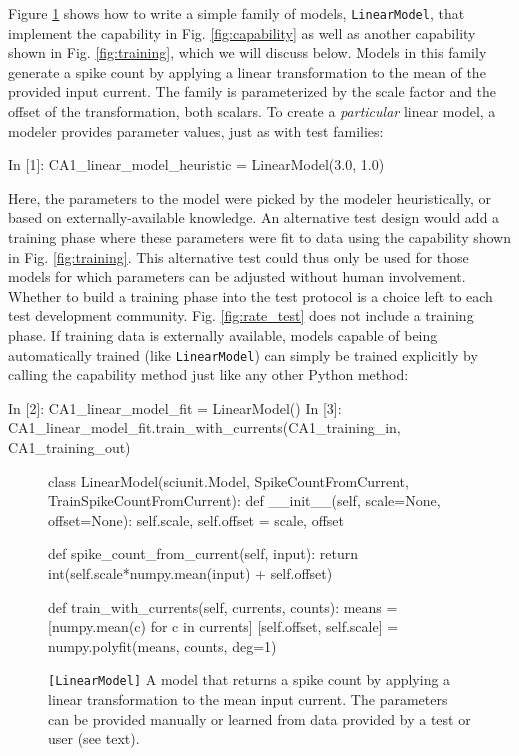 \documentclass{frontiersSCNS}
\let\verbx\lstinline
\begin{document}
Figure \ref{fig:simple_model} shows how to write a simple {family} of models, \verbx{LinearModel}, that implement the capability in Fig. \ref{fig:capability} as well as another capability shown in Fig. \ref{fig:training}, which we will discuss below. 
Models in this family generate a spike count by applying a linear transformation to the mean of the provided input current. 
The family is parameterized by the scale factor and the offset of the transformation, both scalars. 
To create a \emph{particular} linear model, a modeler provides parameter values, just as with test families:
\begin{ipy}
  In [1]: CA1_linear_model_heuristic = LinearModel(3.0, 1.0)
\end{ipy}
Here, the parameters to the model were picked by the modeler heuristically, or based on externally-available knowledge. 
An alternative test design would add a training phase where these parameters were fit to data using the capability shown in Fig. \ref{fig:training}. 
This alternative test could thus only be used for those models for which parameters can be adjusted without human involvement. 
Whether to build a training phase into the test protocol is a choice left to each test development community. 
Fig. \ref{fig:rate_test} does not include a training phase. 
If training data is externally available, models capable of being automatically trained (like \verb|LinearModel|) can simply be trained explicitly by calling the capability method just like any other Python method:
\begin{ipy}
  In [2]: CA1_linear_model_fit = LinearModel()
  In [3]: CA1_linear_model_fit.train_with_currents(CA1_training_in, CA1_training_out)
\end{ipy}
\begin{figure}
\begin{python}
class LinearModel(sciunit.Model, SpikeCountFromCurrent, 
    TrainSpikeCountFromCurrent):
  def __init__(self, scale=None, offset=None): 
    self.scale, self.offset = scale, offset
    
  def spike_count_from_current(self, input):
    return int(self.scale*numpy.mean(input) + self.offset)

  def train_with_currents(self, currents, counts):
    means = [numpy.mean(c) for c in currents]
    [self.offset, self.scale] = numpy.polyfit(means, counts, deg=1)    
\end{python}
\vspace{-15px}
\caption{\texttt{[LinearModel]} A model that returns a spike count by applying a linear transformation to the mean input current. The parameters can be provided manually or learned from data provided by a test or user (see text).}
\label{fig:simple_model}
\vspace{-10px}
\end{figure}
\end{document}
